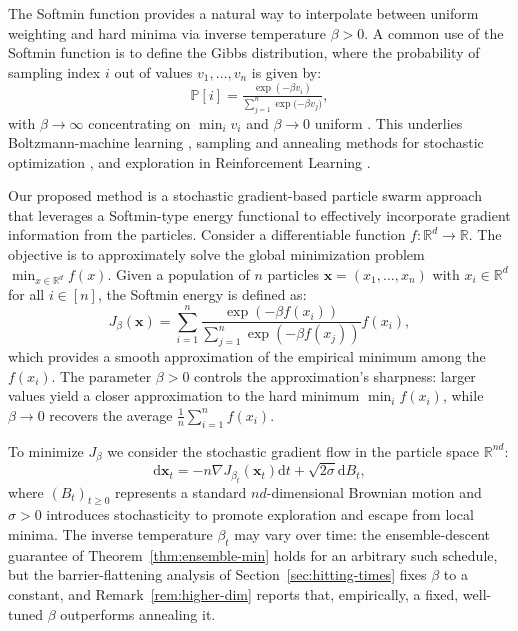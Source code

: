 \documentclass{article}
\newcommand{\dd}{\mathrm d}
\theoremstyle{plain}
\theoremstyle{definition}
\theoremstyle{remark}
\newcommand{\xx}{\mathbf{x}}
\newcommand{\R}{\mathbb{R}}
\begin{document}
The Softmin function provides a natural way to interpolate between uniform weighting and hard minima via inverse temperature $\beta>0$. A common use of the Softmin function is to define the Gibbs distribution, where the probability of sampling index $i$ out of values $v_1,\dots,v_n$ is given by:
\[
    \mathbb{P}[i] = \tfrac{\exp{(-\beta{v_i})}}{\sum_{j=1}^n \exp{(-\beta v_j})},
\]
with $\beta\to\infty$ concentrating on $\min_{i} v_i$ and $\beta\to0$ uniform \cite{bertsekas1999nonlinear}. This underlies Boltzmann-machine learning \cite{ackley1985boltzmann, srivastava2012multimodal}, sampling and annealing methods for stochastic optimization \cite{gelfand1990sampling, gelfand2000gibbs}, and exploration in Reinforcement Learning \cite{pan2019reinforcement, haarnoja2017reinforcement}.

Our proposed method is a stochastic gradient-based particle swarm approach that leverages a Softmin-type energy functional to effectively incorporate gradient information from the particles. Consider a differentiable function $f:\R^d\to\R$. The objective is to approximately solve the global minimization problem $\min_{x\in\R^d}f(x)$. Given a population of $n$ particles $\xx=(x_1,\dots,x_n)$ with $x_i\in\R^d$ for all $i\in[n]$, the Softmin energy is defined as:
\begin{equation}
    J_\beta(\xx)=\sum_{i=1}^n\frac{\exp(-\beta f(x_i))}{\sum_{j=1}^n\exp(-\beta f(x_j))}f(x_i),
    \label{eq:Softmin-energy}
\end{equation}
which provides a smooth approximation of the empirical minimum among the $f(x_i)$. The parameter $\beta>0$ controls the approximation's sharpness: larger values yield a closer approximation to the hard minimum $\min_i f(x_i)$, while $\beta\to0$ recovers the average $\frac 1 n \sum_{i=1}^n f(x_i)$.

To minimize $J_\beta$ we consider the stochastic gradient flow in the particle space $\R^{nd}$:
\begin{equation}\label{e:sde}
   \dd\xx_t = -n\nabla J_{\beta_t}(\xx_t)\dd t+\sqrt{2\sigma}\dd B_t,
\end{equation}
where $(B_t)_{t\geq 0}$ represents a standard $nd$-dimensional Brownian motion and $\sigma>0$ introduces stochasticity to promote exploration and escape from local minima. The inverse temperature $\beta_t$ may vary over time: the ensemble-descent guarantee of Theorem~\ref{thm:ensemble-min} holds for an arbitrary such schedule, but the barrier-flattening analysis of Section~\ref{sec:hitting-times} fixes $\beta$ to a constant, and Remark~\ref{rem:higher-dim} reports that, empirically, a fixed, well-tuned $\beta$ outperforms annealing it.
\end{document}
